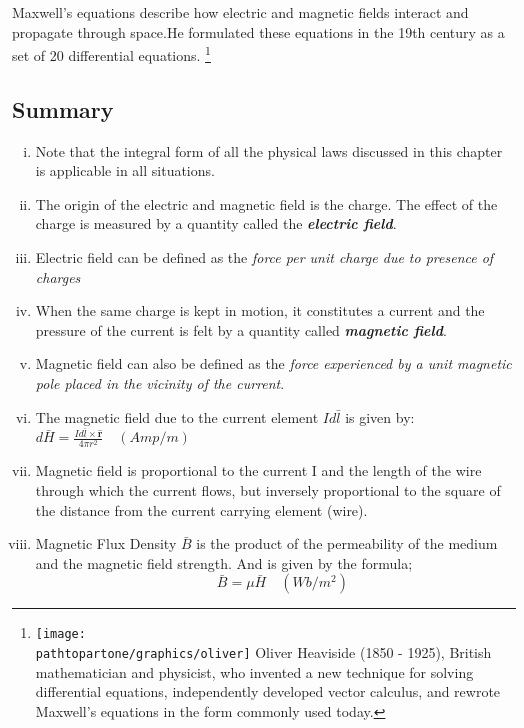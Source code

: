 Maxwell's equations describe how electric and magnetic fields interact and propagate through space.He formulated these equations in the 19th century as a set of 20 differential equations. 
\footnote{
\texttt{[image: \\pathtopartone/graphics/oliver]} 
Oliver Heaviside (1850 - 1925), British mathematician and physicist, who invented a new technique for solving differential equations, independently developed vector calculus, and rewrote Maxwell's equations in the form commonly used today.
}


\begin{mdframed}[backgroundcolor=lightblue, linewidth=1pt, hidealllines=true]
\section{Summary}
\begin{enumerate}[(i)]
\item Note that the integral form of all the physical laws discussed in this chapter is applicable in all situations.

\item The origin of the electric and magnetic field is the charge. The effect of the charge is measured by a quantity called the \textbf{\emph{electric field}}.

\item Electric field can be defined as the \emph{force per unit charge due to presence of charges} 

\item When the same charge is kept in motion, it constitutes a current and the pressure of the current is felt by a quantity called \textbf{\emph{magnetic field}}.

\item Magnetic field can also be defined as the \emph{force experienced by a unit magnetic pole placed in the vicinity of the current}.

\item The magnetic field due to the current element $Id\bar{l}$ is given by:
$\boxed{d\bar{H}= \frac{Id\bar{l} \times \hat{\textbf{r}}}{4\pi r^{2}}}\quad (Amp/m)$ 

\item Magnetic field is proportional to the current I and the length of the wire through which the current flows, but inversely proportional to the square of the distance from the current carrying element (wire).

\item Magnetic Flux Density $\bar{B}$ is the product of the permeability of the medium and the magnetic field strength. And is given by the formula;
$$\quad\boxed{\bar{B} = \mu\bar{H}}\quad (Wb/m^{2})$$


\end{enumerate}
\end{mdframed}
